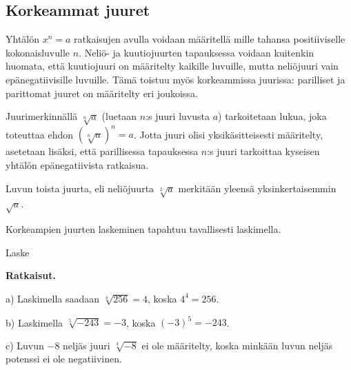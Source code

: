 \subsection*{Korkeammat juuret}


Yhtälön $x^n=a$ ratkaisujen avulla voidaan määritellä   mille tahansa positiiviselle kokonaisluvulle $n$. Neliö- ja kuutiojuurten tapauksessa voidaan kuitenkin huomata, että kuutiojuuri on määritelty kaikille luvuille, mutta neliöjuuri vain epänegatiivisille luvuille. Tämä toistuu myös korkeammissa juurissa: parilliset ja parittomat juuret on määritelty eri joukoissa.

Juurimerkinnällä $\sqrt[n]{a}$ (luetaan $n$:s juuri luvusta $a$) tarkoitetaan lukua, joka toteuttaa ehdon $(\sqrt[n]{a})^n = a$. Jotta juuri olisi yksikäsitteisesti määritelty, asetetaan lisäksi, että parillisessa tapauksessa $n$:s juuri tarkoittaa kyseisen yhtälön epänegatiivista ratkaisua.




Luvun toista juurta, eli neliöjuurta $\sqrt[2]{a}$ merkitään yleensä yksinkertaisemmin $\sqrt{a}$.


Korkeampien juurten laskeminen tapahtuu tavallisesti laskimella.

\begin{esimerkki}
Laske
\begin{alakohdat}
\end{alakohdat}

{\bf Ratkaisut.}

a) Laskimella saadaan $\sqrt[4]{256}=4$, koska $4^4=256$.

b) Laskimella $\sqrt[5]{-243}=-3$, koska $(-3)^5=-243$.

c) Luvun $-8$ neljäs juuri $\sqrt[4]{-8}$ ei ole määritelty, koska minkään luvun neljäs potenssi ei ole negatiivinen.
\end{esimerkki}



